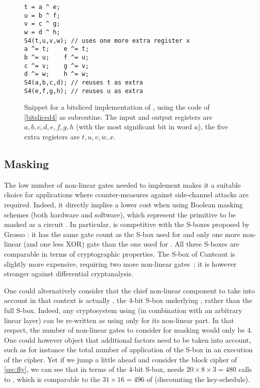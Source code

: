 \begin{figure}[ht]
\begin{verbatim}
t = a ^ e;
u = b ^ f;
v = c ^ g;
w = d ^ h;
S4(t,u,v,w); // uses one more extra register x
a ^= t;    e ^= t;
b ^= u;    f ^= u;
c ^= v;    g ^= v;
d ^= w;    h ^= w;
S4(a,b,c,d); // reuses t as extra
S4(e,f,g,h); // reuses u as extra
\end{verbatim}
\caption[Snippet for a bitsliced \C implementation of \littlunOne.]{Snippet for a bitsliced \C implementation of \littlunOne, using the code of \autoref{bitsliced4} as subroutine\label{bitsliced8}. The input and output registers
are $a,b,c,d,e,f,g,h$ (with the most significant bit in word $a$), the five extra registers are $t,u,v,w,x$.}
\end{figure}


\subsection{Masking}
The low number of non-linear gates needed to implement \littlunOne makes it a suitable choice for applications where counter-measures against side-channel attacks are required.
Indeed, it directly implies a lower cost when using Boolean masking schemes (both hardware and software), which represent the primitive to be masked as a circuit \cite{isw,DBLP:conf/fse/CarletGPQR12}.
In particular, \littlunOne is competitive with the S-boxes proposed by Grosso \etal \cite{lsdesigns}: it has the same gate count as the S-box used for \robin and only
one more non-linear (and one less XOR) gate than the one used for \fantomas. All three S-boxes are comparable in terms of cryptographic properties.
The S-box of Canteaut \etal is slightly more expensive, requiring two more non-linear gates~\cite{sac15}; it is however stronger against differential cryptanalysis.

One could alternatively consider that the chief non-linear component to take into account in that context is actually \littlunS, the 4-bit S-box underlying \littlunOne, rather than the full S-box.
Indeed, any cryptosystem using \littlunOne (in combination with an arbitrary linear layer)
can be re-written as using only \littlunS for its non-linear part. In that respect, the number of non-linear gates to consider for masking would only be 4. One could however
object that
additional factors need to be taken into account, such as for instance the total number of application of the S-box in an execution of the cipher. Yet if we jump a little ahead and
consider the block cipher \fly of \autoref{sec:fly}, we can see that in terms of the 4-bit S-box, \fly needs $20\times8\times3 = 480$ calls to \littlunS, which is
comparable to the $31\times16 = 496$ of \present (discounting the key-schedule).

